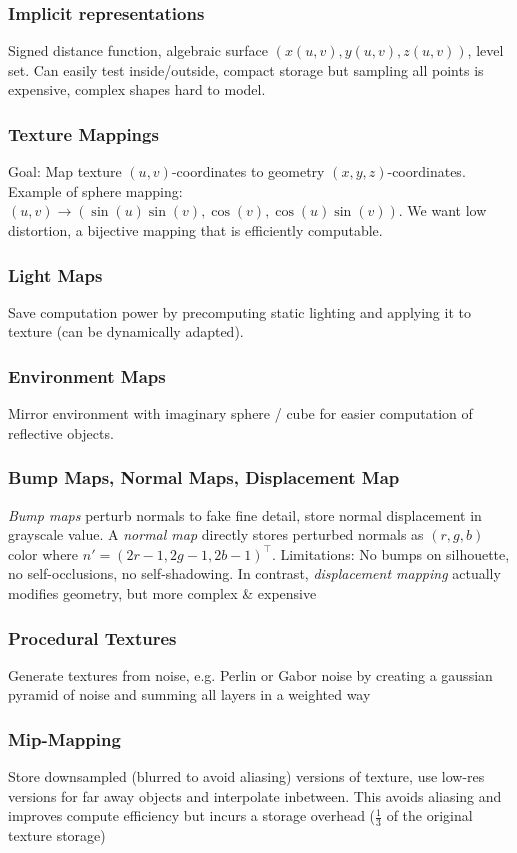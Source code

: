 \documentclass[a4paper,10pt]{article}
\begin{document}
\subsubsection{Implicit representations} Signed distance function, algebraic surface \( (x(u,v), y(u,v), z(u,v)) \), level set. Can easily test inside/outside, compact storage but sampling all points is expensive, complex shapes hard to model.
\subsubsection{Texture Mappings} Goal: Map texture \( (u,v) \)-coordinates to geometry \( (x,y,z) \)-coordinates. Example of sphere mapping: \( (u,v) \to (\sin (u) \sin (v), \cos (v), \cos (u) \sin (v)) \). We want low distortion, a bijective mapping that is efficiently computable.
\subsubsection{Light Maps} Save computation power by precomputing static lighting and applying it to texture (can be dynamically adapted).
\subsubsection{Environment Maps} Mirror environment with imaginary sphere / cube for easier computation of reflective objects.
\subsubsection{Bump Maps, Normal Maps, Displacement Map} \emph{Bump maps} perturb normals to fake fine detail, store normal displacement in grayscale value. A \emph{normal map} directly stores perturbed normals as \( (r,g,b) \) color where \( n' = (2r - 1, 2g - 1, 2b -1)^\top \). Limitations: No bumps on silhouette, no self-occlusions, no self-shadowing. In contrast, \emph{displacement mapping} actually modifies geometry, but more complex \& expensive
\subsubsection{Procedural Textures} Generate textures from noise, e.g. Perlin or Gabor noise by creating a gaussian pyramid of noise and summing all layers in a weighted way
\subsubsection{Mip-Mapping} Store downsampled (blurred to avoid aliasing) versions of texture, use low-res versions for far away objects and interpolate inbetween. This avoids aliasing and improves compute efficiency but incurs a storage overhead (\( \frac{1}{3} \) of the original texture storage)
\end{document}
